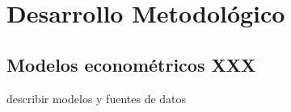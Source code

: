 
\chapter{Desarrollo Metodológico} \label{c3} %


\section{Modelos econométricos XXX}

describir modelos y fuentes de datos
